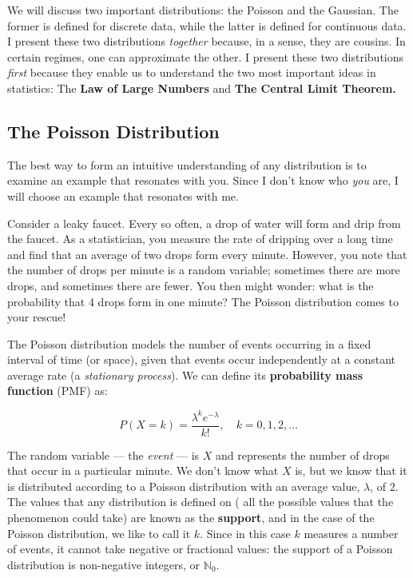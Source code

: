 We will discuss two important distributions: the Poisson and the Gaussian. The former is defined for discrete data, while the latter is defined for continuous data. I present these two distributions \textit{together} because, in a sense, they are cousins. In certain regimes, one can approximate the other. I present these two distributions \textit{first} because they enable us to understand the two most important ideas in statistics: The \textbf{Law of Large Numbers} and \textbf{The Central Limit Theorem.}

\subsection*{The Poisson Distribution}
The best way to form an intuitive understanding of any distribution is to examine an example that resonates with you. Since I don't know who \textit{you} are, I will choose an example that resonates with me.

Consider a leaky faucet. Every so often, a drop of water will form and drip from the faucet. As a statistician, you measure the rate of dripping over a long time and find that an average of two drops form every minute. However, you note that the number of drops per minute is a random variable; sometimes there are more drops, and sometimes there are fewer. You then might wonder: what is the probability that 4 drops form in one minute? The Poisson distribution comes to your rescue!

The Poisson distribution models the number of events occurring in a fixed interval of time (or space), given that events occur independently at a constant average rate (a \textit{stationary process}). We can define its \textbf{probability mass function} (PMF) as:

\begin{equation}
    P(X = k) = \frac{\lambda^k e^{-\lambda}}{k!}, \quad k = 0, 1, 2, \ldots
\end{equation}

The random variable --- the \textit{event} --- is $X$ and represents the number of drops that occur in a particular minute. We don't know what $X$ is, but we know that it is distributed according to a Poisson distribution with an average value, $\lambda$, of 2. The values that any distribution is defined on (\ie{} all the possible values that the phenomenon could take) are known as the \textbf{support}, and in the case of the Poisson distribution, we like to call it $k$. Since in this case $k$ measures a number of events, it cannot take negative or fractional values: the support of a Poisson distribution is non-negative integers, or $\mathbb{N}_0$.

